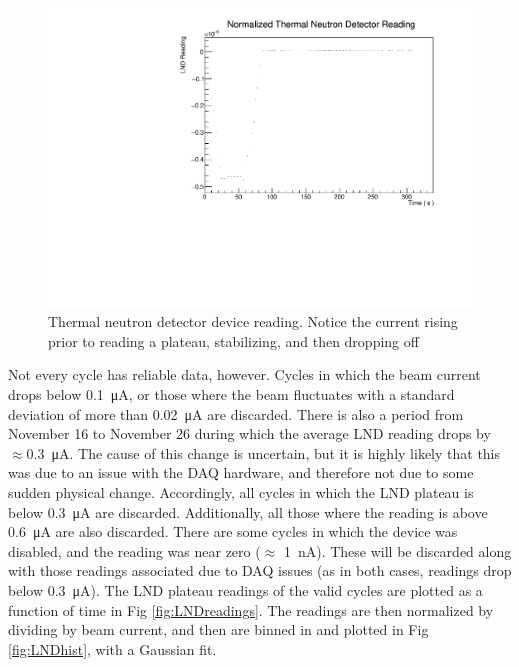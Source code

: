 \documentclass[10pt,letterpaper]{article}
\begin{document}
\begin{figure}
\centering
\includegraphics[width=\textwidth,page=1]{../thermal_neutron_detector/lndReadingVsTimeTCN18-042.pdf}
\caption{Thermal neutron detector device reading. Notice the current rising prior to reading a plateau, stabilizing, and then dropping off}
\label{fig:LNDplateau}
\end{figure}

Not every cycle has reliable data, however. Cycles in which the beam current drops below \SI{0.1}{\micro\ampere}, or those where the beam fluctuates with a standard deviation of more than \SI{0.02}{\micro\ampere} are discarded. There is also a period from November 16 to November 26 during which the average LND reading drops by $\approx$\SI{0.3}{\micro\ampere}. The cause of this change is uncertain, but it is highly likely that this was due to an issue with the DAQ hardware, and therefore not due to some sudden physical change. Accordingly, all cycles in which the LND plateau is below \SI{0.3}{\micro\ampere} are discarded. Additionally, all those where the reading is above \SI{0.6}{\micro\ampere} are also discarded. There are some cycles in which the device was disabled, and the reading was near zero ($\approx$ \SI{1}{\nano\ampere}). These will be discarded along with those readings associated due to DAQ issues (as in both cases, readings drop below \SI{0.3}{\micro\ampere}). The LND plateau readings of the valid cycles are plotted as a function of time in Fig \ref{fig:LNDreadings}. The readings are then normalized by dividing by beam current, and then are binned in and plotted in Fig \ref{fig:LNDhist}, with a Gaussian fit.
\end{document}
